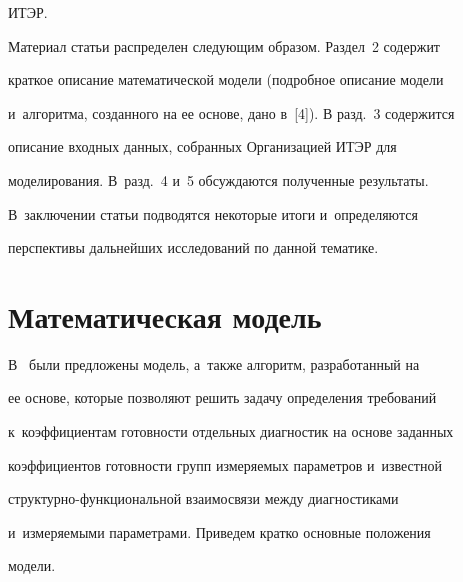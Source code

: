 ИТЭР.





Материал статьи распределен следующим образом. Раздел~2 содержит 


краткое описание математической модели (подробное описание модели 


и~алгоритма, созданного на ее основе, дано в~[4]). В разд.~3 содержится 


описание входных данных, собранных Организацией ИТЭР для 


моделирования. В~разд.~4 и~5 обсуждаются полученные результаты. 


В~заключении статьи подводятся некоторые итоги и~определяются 


перспективы дальнейших исследований по данной тематике. 





\vspace*{-4pt}





\section{Математическая модель}





\vspace*{-2pt}





В~\cite{4-kn} были предложены модель, а~так\-же алгоритм, разработанный на 


ее основе, которые поз\-во\-ля\-ют решить задачу определения требований 


к~коэффициентам готовности отдельных диагностик на основе заданных 


коэффициентов го\-тов\-ности групп из\-ме\-ря\-емых па\-ра\-мет\-ров и~известной  


струк\-тур\-но-функ\-цио\-наль\-ной взаимосвязи меж\-ду диагностиками 


и~из\-ме\-ря\-емы\-ми па\-ра\-мет\-ра\-ми. Приведем крат\-ко основные положения 


модели. 







